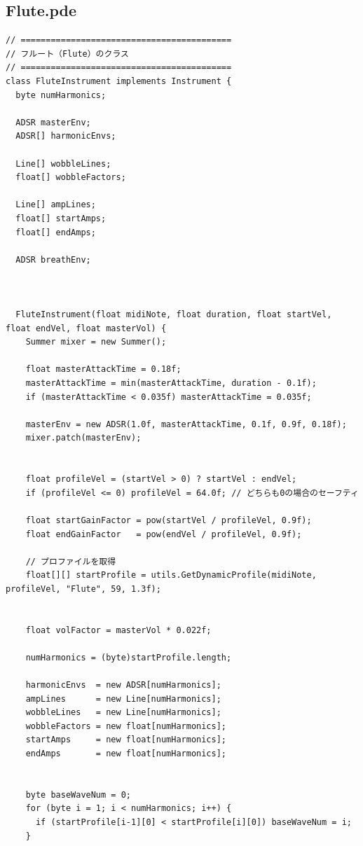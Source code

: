 \subsection{Flute.pde}
\begin{lstlisting}[caption={Flute.pde}, label={lst:proc_flute}]
// ==========================================
// フルート（Flute）のクラス
// ==========================================
class FluteInstrument implements Instrument {
  byte numHarmonics;
  
  ADSR masterEnv;
  ADSR[] harmonicEnvs;
  
  Line[] wobbleLines;
  float[] wobbleFactors;
  
  Line[] ampLines;
  float[] startAmps;
  float[] endAmps;
  
  ADSR breathEnv;
  
  
  
  FluteInstrument(float midiNote, float duration, float startVel, float endVel, float masterVol) {
    Summer mixer = new Summer();
    
    float masterAttackTime = 0.18f;
    masterAttackTime = min(masterAttackTime, duration - 0.1f);
    if (masterAttackTime < 0.035f) masterAttackTime = 0.035f;
    
    masterEnv = new ADSR(1.0f, masterAttackTime, 0.1f, 0.9f, 0.18f);
    mixer.patch(masterEnv);
    
    
    float profileVel = (startVel > 0) ? startVel : endVel;
    if (profileVel <= 0) profileVel = 64.0f; // どちらも0の場合のセーフティ
    
    float startGainFactor = pow(startVel / profileVel, 0.9f);
    float endGainFactor   = pow(endVel / profileVel, 0.9f);
    
    // プロファイルを取得
    float[][] startProfile = utils.GetDynamicProfile(midiNote, profileVel, "Flute", 59, 1.3f);
    
    
    float volFactor = masterVol * 0.022f;
    
    numHarmonics = (byte)startProfile.length;
    
    harmonicEnvs  = new ADSR[numHarmonics];
    ampLines      = new Line[numHarmonics];
    wobbleLines   = new Line[numHarmonics];
    wobbleFactors = new float[numHarmonics];
    startAmps     = new float[numHarmonics];
    endAmps       = new float[numHarmonics];
    
    
    byte baseWaveNum = 0;
    for (byte i = 1; i < numHarmonics; i++) {
      if (startProfile[i-1][0] < startProfile[i][0]) baseWaveNum = i;
    }
    

\end{lstlisting}
